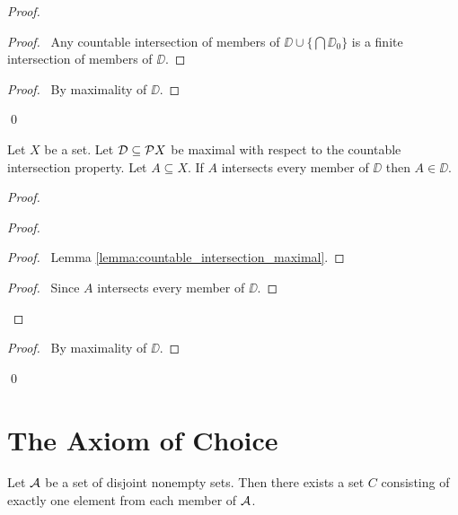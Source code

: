 \begin{proof}
    \pf
    \begin{proof}
        \pf\ Any countable intersection of members of $\DD \cup \{ \bigcap \DD_0 \}$
        is a finite intersection of members of $\DD$.
    \end{proof}
    \begin{proof}
        \pf\ By maximality of $\DD$.
    \end{proof}
    \qed
\end{proof}

\begin{lemma}
    Let $X$ be a set. Let $\DD \subseteq \pow X$ be maximal with respect to the countable intersection property.
    Let $A \subseteq X$. If $A$ intersects every member of $\DD$ then $A \in \DD$.
\end{lemma}

\begin{proof}
    \pf
    \begin{proof}
        \begin{proof}
            \pf\ Lemma \ref{lemma:countable_intersection_maximal}.
        \end{proof}
        \begin{proof}
            \pf\ Since $A$ intersects every member of $\DD$.
        \end{proof}
    \end{proof}
    \qedstep
    \begin{proof}
        \pf\ By maximality of $\DD$.
    \end{proof}
    \qed
\end{proof}

\section{The Axiom of Choice}

\begin{axiom}
    Let $\AA$ be a set of disjoint nonempty sets. Then there exists a set $C$ consisting of exactly one element from each member of $\AA$.
\end{axiom}

